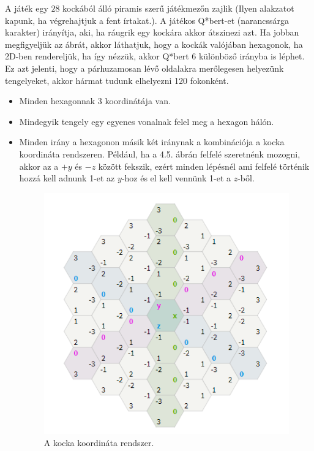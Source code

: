 \noindent A játék egy $28$ kockából álló piramis szerű játékmezőn zajlik (Ilyen alakzatot kapunk, ha végrehajtjuk a fent írtakat.). A játékos Q*bert-et (narancssárga karakter) irányítja, aki, ha ráugrik egy kockára akkor átszinezi azt.
\newline
\newline Ha jobban megfigyeljük az ábrát, akkor láthatjuk, hogy a kockák valójában hexagonok, ha 2D-ben rendereljük, ha így nézzük, akkor Q*bert 6 különböző irányba is léphet. Ez azt jelenti, hogy a párhuzamosan lévő oldalakra merőlegesen helyezünk tengelyeket, akkor hármat tudunk elhelyezni 120 fokonként.

\begin{itemize}
\item Minden hexagonnak 3 koordinátája van. 
\item Mindegyik tengely egy egyenes vonalnak felel meg a hexagon hálón.
\item Minden irány a hexagonon másik két iránynak a kombinációja a kocka koordináta rendszeren. Például, ha a 4.5. ábrán felfelé szeretnénk mozogni, akkor az a {\color{magenta} $+y$} és {\color{blue} $-z$} között fekszik, ezért minden lépésnél ami felfelé történik hozzá kell adnunk 1-et az {\color{magenta} $y$}-hoz és el kell vennünk 1-et a {\color{blue} $z$}-ből. 


\begin{figure}[h]
\centering
\includegraphics[scale=0.3]{kepek/img45.png}
\caption{A kocka koordináta rendszer.}
\label{fig:img45}
\end{figure}

\end{itemize}

